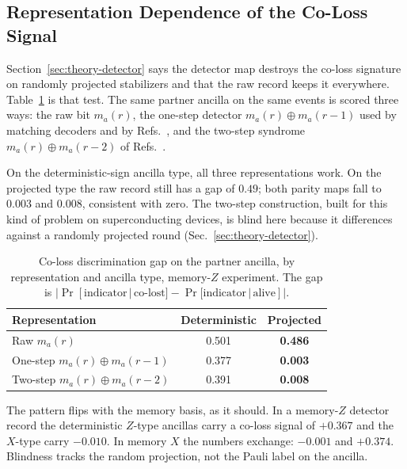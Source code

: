 \documentclass{ieeeaccess}
\begin{document}
\subsection{Representation Dependence of the Co-Loss Signal}
\label{sec:res-representation}

Section~\ref{sec:theory-detector} says the detector map destroys the co-loss
signature on randomly projected stabilizers and that the raw record keeps it
everywhere. Table~\ref{tab:representation} is that test. The same partner
ancilla on the same events is scored three ways: the raw bit $m_a(r)$, the
one-step detector $m_a(r)\oplus m_a(r-1)$ used by matching decoders and by
Refs.~\cite{spitz2018adaptiveweight,blumekohout2025detectorerrormodels}, and
the two-step syndrome $m_a(r)\oplus m_a(r-2)$ of
Refs.~\cite{bultink2020repetitiveparity,varbanov2020leakagedetection}.

On the deterministic-sign ancilla type, all three representations work. On the
projected type the raw record still has a gap of $0.49$; both parity maps fall
to $0.003$ and $0.008$, consistent with zero. The two-step construction,
built for this kind of problem on superconducting devices, is blind here
because it differences against a randomly projected round
(Sec.~\ref{sec:theory-detector}).

\begin{table}[!t]
\caption{Co-loss discrimination gap on the partner ancilla, by representation
and ancilla type, memory-$Z$ experiment. The gap is
$|\Pr[\text{indicator}\,|\,\text{co-lost}] -
\Pr[\text{indicator}\,|\,\text{alive}]|$.}
\label{tab:representation}
\centering
\begin{tabular}{@{}lcc@{}}
\toprule
Representation & Deterministic & Projected \\
\midrule
Raw $m_a(r)$ & 0.501 & \textbf{0.486} \\
One-step $m_a(r)\oplus m_a(r-1)$ & 0.377 & \textbf{0.003} \\
Two-step $m_a(r)\oplus m_a(r-2)$ & 0.391 & \textbf{0.008} \\
\bottomrule
\end{tabular}
\end{table}

The pattern flips with the memory basis, as it should. In a memory-$Z$
detector record the deterministic $Z$-type ancillas carry a co-loss signal of
$+0.367$ and the $X$-type carry $-0.010$. In memory $X$ the numbers exchange:
$-0.001$ and $+0.374$. Blindness tracks the random projection, not the Pauli
label on the ancilla.
\end{document}
